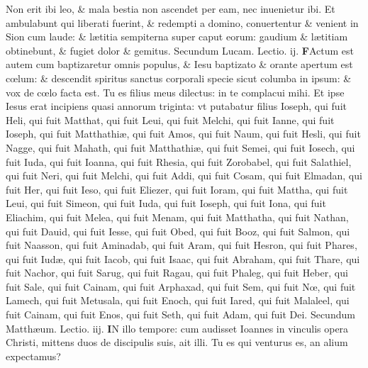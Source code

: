 \documentclass[a5paper,10pt]{book}
\def\leftmarginnote{%
	\lrmarginnote{\hskip -\marginparsep \hskip -6.5em}}
\def\rightmarginnote{%
	\lrmarginnote{\hskip\columnwidth \hskip -1em}}
\def\ae{æ}
\def\oe{œ}
\begin{document}
\begin{multicols*}{2}
Non erit ibi leo, \& mala bestia non ascendet per eam, nec inuenietur ibi.
Et ambulabunt qui liberati fuerint, \& redempti a domino, conuertentur \& venient in Sion cum laude: \& l\ae titia sempiterna super caput eorum: gaudium \& l\ae titiam obtinebunt, \& fugiet dolor \& gemitus.
\newline \color{red} Secundum Lucam. \hfill Lectio. ij. \color{black}
\vspace{-.25em}
\lettrine[lines=2]{\bfseries \color{red} F}{}Actum\rightmarginnote{ca. 3.} est autem cum baptizaretur omnis populus, \& Iesu baptizato \& orante apertum est c\oe lum: \& descendit spiritus sanctus corporali specie sicut columba in ipsum: \& vox de c\oe lo facta est.
Tu es filius meus dilectus: in te complacui mihi.
Et ipse Iesus erat incipiens quasi annorum triginta: vt putabatur filius Ioseph, qui fuit Heli, qui fuit Matthat, qui fuit Leui, qui fuit Melchi,
qui fuit Ianne, qui fuit Ioseph, qui fuit Matthathi\ae , qui fuit Amos, qui fuit Naum, qui fuit Hesli, qui fuit Nagge, qui fuit Mahath, qui fuit Matthathi\ae , qui fuit Semei, qui fuit Iosech, qui fuit Iuda, qui fuit Ioanna, qui fuit Rhesia, qui fuit Zorobabel, qui fuit Salathiel, qui fuit Neri, qui fuit Melchi, qui fuit Addi, qui fuit Cosam, qui fuit Elmadan, qui fuit Her, qui fuit Ieso, qui fuit Eliezer, qui fuit Ioram, qui fuit Mattha, qui fuit Leui, qui fuit Simeon, qui fuit Iuda, qui fuit Ioseph, qui fuit Iona, qui fuit Eliachim, qui fuit Melea, qui fuit Menam, qui fuit Matthatha, qui fuit Nathan, qui fuit Dauid, qui fuit Iesse, qui fuit Obed, qui fuit Booz, qui fuit Salmon, qui fuit Naasson, qui fuit Aminadab, qui fuit Aram, qui fuit Hesron, qui fuit Phares, qui fuit Iud\ae , qui fuit Iacob, qui fuit Isaac, qui fuit Abraham, qui fuit Thare, qui fuit Nachor, qui fuit Sarug, qui fuit Ragau, qui fuit Phaleg, qui fuit Heber, qui fuit Sale, qui fuit Cainam, qui fuit Arphaxad, qui fuit Sem, qui fuit N\oe , qui fuit Lamech, qui fuit Metusala, qui fuit Enoch, qui fuit Iared, qui fuit Malaleel, qui fuit Cainam, qui fuit Enos, qui fuit Seth, qui fuit Adam, qui fuit Dei.
\newline \color{red} Secundum Matth\ae um. \hfill Lectio. iij. \color{black}
\vspace{-.25em}
\lettrine[lines=2]{\bfseries \color{red} I}{}N\leftmarginnote{\begin{flushright}c. 11.\end{flushright}} illo tempore: cum audisset Ioannes in vinculis opera Christi, mittens duos de discipulis suis, ait illi. Tu es qui venturus es, an alium expectamus?

\end{multicols*}
\end{document}
